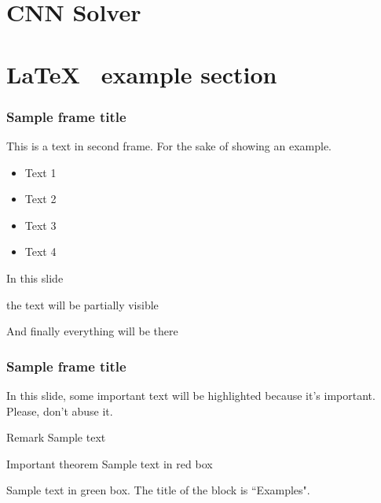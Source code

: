 \documentclass{beamer}
\begin{document}

\section{CNN Solver}






\section{\LaTeX ~ example section}

\begin{frame}
\frametitle{Sample frame title}
This is a text in second frame. For the sake of showing an example.

\begin{itemize}
    \item Text 1
    \item Text 2
    \item Text 3
    \item Text 4
\end{itemize}
\end{frame}


\begin{frame}
In this slide \pause

the text will be partially visible \pause

And finally everything will be there
\end{frame}


\begin{frame}
\frametitle{Sample frame title}

In this slide, some important text will be
\alert{highlighted} because it's important.
Please, don't abuse it.

\begin{block}{Remark}
Sample text
\end{block}

\begin{alertblock}{Important theorem}
Sample text in red box
\end{alertblock}

\begin{examples}
Sample text in green box. The title of the block is ``Examples".
\end{examples}
\end{frame}
\end{document}
